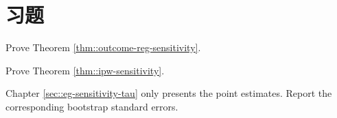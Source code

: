 \section{习题}\label{sec:18-homework}

\begin{HomeworkProblem}\label{exr:18-1}

Prove Theorem \ref{thm::outcome-reg-sensitivity}.

\end{HomeworkProblem}

\begin{HomeworkProblem}\label{exr:18-2}

Prove Theorem \ref{thm::ipw-sensitivity}.


\end{HomeworkProblem}

\begin{HomeworkProblem}\label{exr:18-3}

Chapter \ref{sec::eg-sensitivity-tau} only presents the point estimates. Report the corresponding bootstrap standard errors.




\end{HomeworkProblem}

